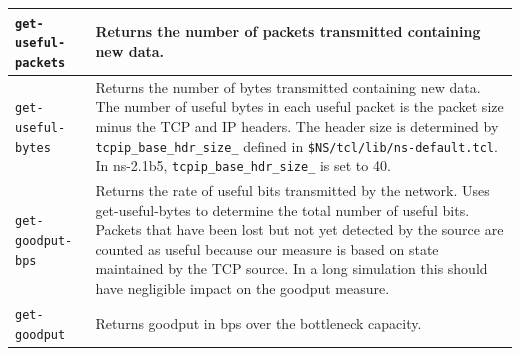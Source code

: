 \documentclass[11pt]{article}
\begin{document}
\begin{table}[ht]
\begin{center}
\begin{tabular}{|l|l|}\hline
\verb|get-useful-packets| & 
  \begin{minipage}[c]{4in}
  \vspace{0.05in}
  Returns the number of packets transmitted containing new data.
  \vspace{0.05in}
  \end{minipage} \\ \hline

\verb|get-useful-bytes| &
  \begin{minipage}[c]{4in}
  \vspace{0.05in}
  Returns the number of bytes transmitted containing new
  data.  The number of useful bytes in each useful packet
  is the packet size minus the TCP and IP headers.  The header size
  is determined by \verb|tcpip_base_hdr_size_| defined in
  \verb|$NS/tcl/lib/ns-default.tcl|.  In ns-2.1b5, 
  \verb|tcpip_base_hdr_size_| is set to 40.
  \vspace{0.05in}
  \end{minipage} \\ \hline

\verb|get-goodput-bps| &
  \begin{minipage}[c]{4in}
  \vspace{0.05in}

  Returns the rate of useful bits transmitted by the network.  Uses
  get-useful-bytes to determine the total number of useful bits.
  Packets that have been lost but not yet detected by the source are
  counted as useful because our measure is based on state maintained
  by the TCP source.  In a long simulation this should have negligible
  impact on the goodput measure.

  \vspace{0.05in} \end{minipage} \\  \hline


\verb|get-goodput| &
  \begin{minipage}[c]{4in}
  \vspace{0.05in}

  Returns goodput in bps over the bottleneck capacity.
  
  \vspace{0.05in}
  \end{minipage} \\ \hline


\end{tabular}
\end{center}
\end{table}
\end{document}
